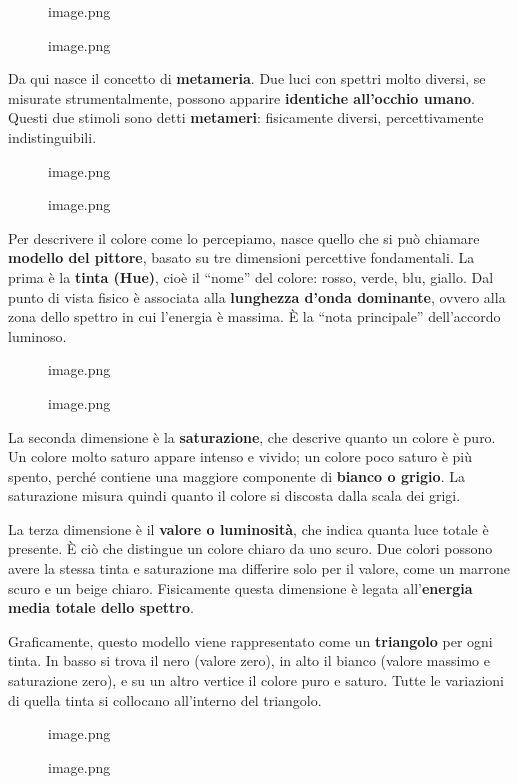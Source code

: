 \documentclass[
]{article}
\begin{document}
\begin{figure}
\centering
{image.png}
\caption{image.png}
\end{figure}

Da qui nasce il concetto di \textbf{metameria}. Due luci con spettri molto diversi, se misurate strumentalmente, possono apparire \textbf{identiche all'occhio umano}. Questi due stimoli sono detti \textbf{metameri}: fisicamente diversi, percettivamente indistinguibili.

\begin{figure}
\centering
{image.png}
\caption{image.png}
\end{figure}

Per descrivere il colore come lo percepiamo, nasce quello che si può chiamare \textbf{modello del pittore}, basato su tre dimensioni percettive fondamentali. La prima è la \textbf{tinta (Hue)}, cioè il ``nome'' del colore: rosso, verde, blu, giallo. Dal punto di vista fisico è associata alla \textbf{lunghezza d'onda dominante}, ovvero alla zona dello spettro in cui l'energia è massima. È la ``nota principale'' dell'accordo luminoso.

\begin{figure}
\centering
{image.png}
\caption{image.png}
\end{figure}

La seconda dimensione è la \textbf{saturazione}, che descrive quanto un colore è puro. Un colore molto saturo appare intenso e vivido; un colore poco saturo è più spento, perché contiene una maggiore componente di \textbf{bianco o grigio}. La saturazione misura quindi quanto il colore si discosta dalla scala dei grigi.

La terza dimensione è il \textbf{valore o luminosità}, che indica quanta luce totale è presente. È ciò che distingue un colore chiaro da uno scuro. Due colori possono avere la stessa tinta e saturazione ma differire solo per il valore, come un marrone scuro e un beige chiaro. Fisicamente questa dimensione è legata all'\textbf{energia media totale dello spettro}.

Graficamente, questo modello viene rappresentato come un \textbf{triangolo} per ogni tinta. In basso si trova il nero (valore zero), in alto il bianco (valore massimo e saturazione zero), e su un altro vertice il colore puro e saturo. Tutte le variazioni di quella tinta si collocano all'interno del triangolo.

\begin{figure}
\centering
{image.png}
\caption{image.png}
\end{figure}
\end{document}

